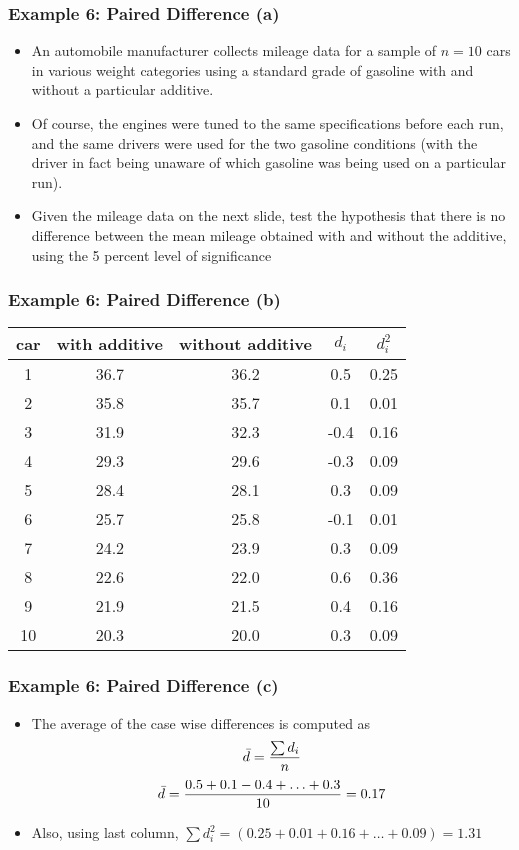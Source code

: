 \begin{frame}
\frametitle{Example 6: Paired Difference (a)}
\begin{itemize}
\item An automobile manufacturer collects mileage data for a sample of $n = 10$ cars in various weight categories
using a standard grade of gasoline with and without a particular additive. \item Of course, the engines were tuned to the same
specifications before each run, and the same drivers were used for the two gasoline conditions (with the driver in fact being
unaware of which gasoline was being used on a particular run). \item Given the mileage data on the next slide,  test the hypothesis
that there is no difference between the mean mileage obtained with and without the additive, using the 5 percent level of
significance \end{itemize}
\end{frame}
\begin{frame}
\frametitle{Example 6: Paired Difference (b)}
\small
\begin{center}
\begin{tabular}{|c|c|c|c|c|}\hline
car & with additive & without additive & $d_i$ & $d^2_i$\\\hline
1&36.7&36.2&0.5&0.25\\\hline
2&35.8&35.7&0.1&0.01\\\hline
3&31.9&32.3&-0.4&0.16\\\hline
4&29.3&29.6&-0.3&0.09\\\hline
5&28.4&28.1&0.3&0.09\\\hline
6&25.7&25.8&-0.1&0.01\\\hline
7&24.2&23.9&0.3&0.09\\\hline
8&22.6&22.0&0.6&0.36\\\hline
9&21.9&21.5&0.4&0.16\\\hline
10&20.3&20.0&0.3&0.09\\\hline
\end{tabular}
\end{center}
\end{frame}

\begin{frame}
\frametitle{Example 6: Paired Difference (c)}
\begin{itemize}
\item The average of the case wise differences is computed as \[\bar{d} = {\sum d_i \over n}\]
\[ \bar{d} = { 0.5 + 0.1  - 0.4 + \ldots + 0.3 \over 10 }= 0.17 \]
\item Also, using last column, $\sum d^2_i = (0.25 + 0.01 + 0.16 + \ldots + 0.09) = 1.31$
\end{itemize}

\end{frame}


